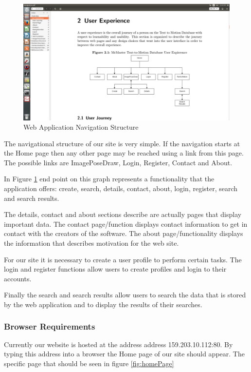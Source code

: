 \documentclass{scrreprt}
\begin{document}
\begin{figure}
  \includegraphics[width=\linewidth]{apppicture.png}
  \caption{Web Application Navigation Structure}
  \label{fig:navStruct}
\end{figure}

The navigational structure of our site is very simple.  If the navigation
starts at the Home page then any other page may be reached using a link from
this page.  The possible links are ImagePoseDraw, Login, Register, Contact and
About.

In Figure \ref{fig:navStruct} end point on this graph represents a
functionality that the application offers: create, search, details, contact,
about, login, register, search and search results.

The details, contact and about sections describe are actually pages that
display important data.  The contact page/function displays contact information
to get in contact with the creators of the software.  The about
page/functionality displays the information that describes motivation for the
web site.

For our site it is necessary to create a user profile to perform certain tasks.
The login and register functions allow users to create profiles and login to
their accounts.

Finally the search and search results allow users to search the data that is
stored by the web application and to display the results of their searches.

\subsubsection{Browser Requirements}

Currently our website is hosted at the address address 159.203.10.112:80. By
typing this address into a browser the Home page of our site should appear. The
specific page that should be seen in figure \ref{fig:homePage}
\end{document}
